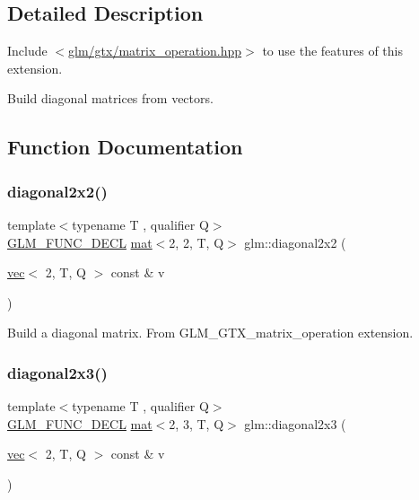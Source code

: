 \subsection{Detailed Description}
Include $<$\hyperlink{matrix__operation_8hpp}{glm/gtx/matrix\+\_\+operation.\+hpp}$>$ to use the features of this extension.

Build diagonal matrices from vectors. 

\subsection{Function Documentation}
\mbox{\label{group__gtx__matrix__operation_ga58a32a2beeb2478dae2a721368cdd4ac}} 
\subsubsection{\texorpdfstring{diagonal2x2()}{diagonal2x2()}}
{\footnotesize\ttfamily template$<$typename T , qualifier Q$>$ \\
\hyperlink{setup_8hpp_ab2d052de21a70539923e9bcbf6e83a51}{G\+L\+M\+\_\+\+F\+U\+N\+C\+\_\+\+D\+E\+CL} \hyperlink{structglm_1_1mat}{mat}$<$2, 2, T, Q$>$ glm\+::diagonal2x2 (\begin{DoxyParamCaption}\item[{\hyperlink{structglm_1_1vec}{vec}$<$ 2, T, Q $>$ const \&}]{v }\end{DoxyParamCaption})}

Build a diagonal matrix. From G\+L\+M\+\_\+\+G\+T\+X\+\_\+matrix\+\_\+operation extension. \mbox{\label{group__gtx__matrix__operation_gab69f900206a430e2875a5a073851e175}} 
\subsubsection{\texorpdfstring{diagonal2x3()}{diagonal2x3()}}
{\footnotesize\ttfamily template$<$typename T , qualifier Q$>$ \\
\hyperlink{setup_8hpp_ab2d052de21a70539923e9bcbf6e83a51}{G\+L\+M\+\_\+\+F\+U\+N\+C\+\_\+\+D\+E\+CL} \hyperlink{structglm_1_1mat}{mat}$<$2, 3, T, Q$>$ glm\+::diagonal2x3 (\begin{DoxyParamCaption}\item[{\hyperlink{structglm_1_1vec}{vec}$<$ 2, T, Q $>$ const \&}]{v }\end{DoxyParamCaption})}

